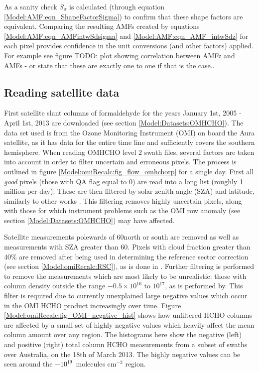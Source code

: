     As a sanity check $S_\sigma$ is calculated (through equation \ref{Model:AMF:eqn_ShapeFactorSigma}) to confirm that these shape factors are equivalent.
    Comparing the resulting AMFs created by equations \ref{Model:AMF:eqn_AMFintwSdsigma} and \ref{Model:AMF:eqn_AMF_intwSdz} for each pixel provides confidence in the unit conversions (and other factors) applied.
    For example see figure TODO: plot showing correlation between AMFz and AMFs - or state that these are exactly one to one if that is the case..
    
    
    
  \subsection{Reading satellite data}
    
    First satellite slant columns of formaldehyde for the years January 1st, 2005 - April 1st, 2013 are downloaded (see section \ref{Model:Datasets:OMHCHO}).
    The data set used is from the Ozone Monitoring Instrument (OMI) on board the Aura satellite, as it has data for the entire time line and sufficiently covers the southern hemisphere.
    When reading OMHCHO level 2 swath files, several factors are taken into account in order to filter uncertain and erroneous pixels.
    The process is outlined in figure  \ref{Model:omiRecalc:fig_flow_omhchorp} for a single day.
    First all \textit{good} pixels (those with QA flag equal to 0) are read into a long list (roughly 1 million per day).
    These are then filtered by solar zenith angle (SZA) and latitude, similarly to other works \parencite[e.g.,]{Marais2012, Barkley2013, Bauwens2016, Zhu2016}.
    This filtering removes highly uncertain pixels, along with those for which instrument problems such as the OMI row anomaly (see section \ref{Model:Datasets:OMHCHO}) may have affected.
    
    Satellite measurements polewards of 60\degr north or south are removed as well as measurements with SZA greater than 60\degr.
    Pixels with cloud fraction greater than 40\% are removed after being used in determining the reference sector correction (see section \ref{Model:omiRecalc:RSC}), as is done in \textcite{Abad2015, DeSmedt2015}.
    Further filtering is performed to remove the measurements which are most likely to be unrealistic: those with column density outside the range $-0.5 \times 10^{16}$ to $10^{17} $\moleccm, as is performed by\textcite{Zhu2016}.
    This filter is required due to currently unexplained large negative values which occur in the OMI HCHO product increasingly over time.
    Figure \ref{Model:omiRecalc:fig_OMI_negative_hist} shows how unfiltered HCHO columns are affected by a small set of highly negative values which heavily affect the mean column amount over any region.
    The histograms here show the negative (left) and positive (right) total column HCHO measurements from a subset of swaths over Australia, on the 18th of March 2013.
    The highly negative values can be seen around the $-10^{19}$~molecules cm$^{-2}$ region.
    
